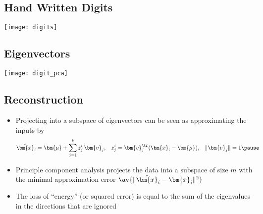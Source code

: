 
\begin{slide}
\section{Hand Written Digits}

\begin{center}
  \texttt{[image: digits]}
\end{center}
\end{slide}


\begin{slide}
\section{Eigenvectors}

\begin{center}
  \texttt{[image: digit\_pca]}
\end{center}
\end{slide}


\begin{slide}
\section[-2]{Reconstruction}

\begin{PauseHighLight}
  \begin{itemize}
  \item Projecting into a subspace of eigenvectors can be seen as
    approximating the inputs by
    \begin{align*}
      \hat{\bm{x}}_i  &= \bm{\mu} + \sum_{j=1}^k z_j^i\,\bm{v}_j , &
      z_j^i &= \bm{v}_j^\tr (\bm{x}_i-\bm{\mu}), &  \|\bm{v}_j\|&=1    \pause
    \end{align*}
  \item Principle component analysis projects the data into a subspace
    of size $m$ with the minimal approximation error
    $\av{\|\hat{\bm{x}}_i-\bm{x}_i\|^2}$ \pause
    \item The loss of ``energy'' (or squared error) is equal to the sum of the eigenvalues
      in the directions that are ignored\pause
  \end{itemize}
\end{PauseHighLight}

\end{slide}


